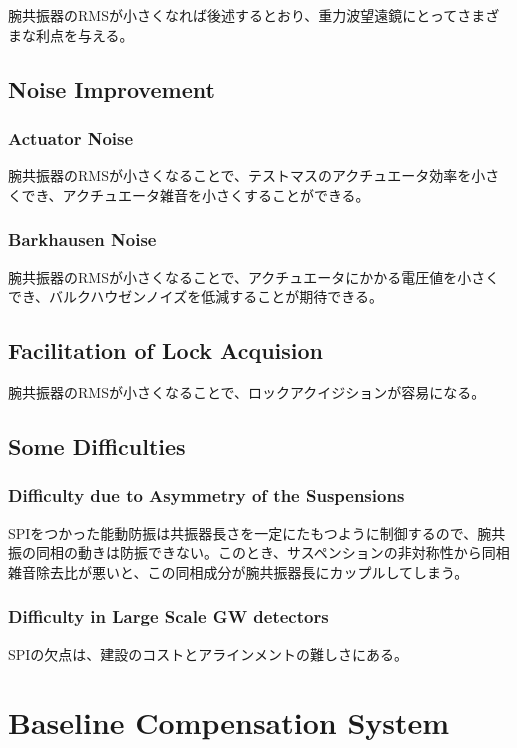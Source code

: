 腕共振器のRMSが小さくなれば後述するとおり、重力波望遠鏡にとってさまざまな利点を与える。

\subsection{Noise Improvement}
\subsubsection{Actuator Noise}
腕共振器のRMSが小さくなることで、テストマスのアクチュエータ効率を小さくでき、アクチュエータ雑音を小さくすることができる。

\subsubsection{Barkhausen Noise}
腕共振器のRMSが小さくなることで、アクチュエータにかかる電圧値を小さくでき、バルクハウゼンノイズを低減することが期待できる。

\cite{manson1972frequency}
\cite{aasi2015characterization}
\cite{cote1991self}

\subsection{Facilitation of Lock Acquision}
腕共振器のRMSが小さくなることで、ロックアクイジションが容易になる。

\subsection{Some Difficulties}
\subsubsection{Difficulty due to Asymmetry of the Suspensions}
SPIをつかった能動防振は共振器長さを一定にたもつように制御するので、腕共振の同相の動きは防振できない。このとき、サスペンションの非対称性から同相雑音除去比が悪いと、この同相成分が腕共振器長にカップルしてしまう。

\subsubsection{Difficulty in Large Scale GW detectors}
SPIの欠点は、建設のコストとアラインメントの難しさにある。

%
\section{Baseline Compensation System}\label{sec:52}
